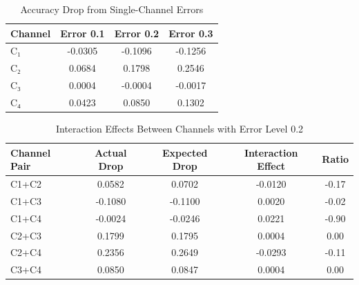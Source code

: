 \begin{table}[t]
\centering
\caption{Accuracy Drop from Single-Channel Errors}
\label{tab:error_single}
\begin{tabular}{lccc}
\toprule
Channel & Error 0.1 & Error 0.2 & Error 0.3 \\
\midrule
C₁ & -0.0305 & -0.1096 & -0.1256 \\
C₂ & 0.0684 & 0.1798 & 0.2546 \\
C₃ & 0.0004 & -0.0004 & -0.0017 \\
C₄ & 0.0423 & 0.0850 & 0.1302 \\
\bottomrule
\end{tabular}
\end{table}

\begin{table}[t]
\centering
\caption{Interaction Effects Between Channels with Error Level 0.2}
\label{tab:error_multi}
\begin{tabular}{lcccc}
\toprule
Channel Pair & Actual Drop & Expected Drop & Interaction Effect & Ratio \\
\midrule
C1+C2 & 0.0582 & 0.0702 & -0.0120 & -0.17 \\
C1+C3 & -0.1080 & -0.1100 & 0.0020 & -0.02 \\
C1+C4 & -0.0024 & -0.0246 & 0.0221 & -0.90 \\
C2+C3 & 0.1799 & 0.1795 & 0.0004 & 0.00 \\
C2+C4 & 0.2356 & 0.2649 & -0.0293 & -0.11 \\
C3+C4 & 0.0850 & 0.0847 & 0.0004 & 0.00 \\
\bottomrule
\end{tabular}
\end{table}
